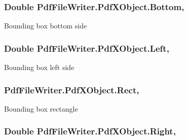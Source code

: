\subsubsection[{\texorpdfstring{Bottom}{Bottom}}]{\setlength{\rightskip}{0pt plus 5cm}Double Pdf\+File\+Writer.\+Pdf\+X\+Object.\+Bottom\hspace{0.3cm}{\ttfamily [get]}, {\ttfamily [set]}}\hypertarget{class_pdf_file_writer_1_1_pdf_x_object_a1ad95b8f6e73069322ba17eaa1c15009}{}\label{class_pdf_file_writer_1_1_pdf_x_object_a1ad95b8f6e73069322ba17eaa1c15009}


Bounding box bottom side 

\subsubsection[{\texorpdfstring{Left}{Left}}]{\setlength{\rightskip}{0pt plus 5cm}Double Pdf\+File\+Writer.\+Pdf\+X\+Object.\+Left\hspace{0.3cm}{\ttfamily [get]}, {\ttfamily [set]}}\hypertarget{class_pdf_file_writer_1_1_pdf_x_object_abb625de702ab0b9173e8b6986c5fc897}{}\label{class_pdf_file_writer_1_1_pdf_x_object_abb625de702ab0b9173e8b6986c5fc897}


Bounding box left side 

\subsubsection[{\texorpdfstring{Rect}{Rect}}]{ Pdf\+File\+Writer.\+Pdf\+X\+Object.\+Rect\hspace{0.3cm}{\ttfamily [get]}, {\ttfamily [set]}}\hypertarget{class_pdf_file_writer_1_1_pdf_x_object_a36a3e526715046c9383a346ddc79c115}{}\label{class_pdf_file_writer_1_1_pdf_x_object_a36a3e526715046c9383a346ddc79c115}


Bounding box rectangle 

\subsubsection[{\texorpdfstring{Right}{Right}}]{\setlength{\rightskip}{0pt plus 5cm}Double Pdf\+File\+Writer.\+Pdf\+X\+Object.\+Right\hspace{0.3cm}{\ttfamily [get]}, {\ttfamily [set]}}\hypertarget{class_pdf_file_writer_1_1_pdf_x_object_ad310f9733f70f8437b1d8bd14672b46b}{}\label{class_pdf_file_writer_1_1_pdf_x_object_ad310f9733f70f8437b1d8bd14672b46b}


